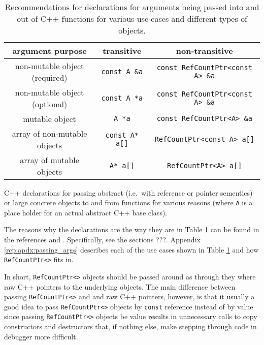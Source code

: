 \begin{table}
\begin{minipage}{{}\textwidth}
\end{minipage}
%
\\[5ex]
%
\begin{minipage}{{}\textwidth}
\begin{tabular}{|c|c|c|}
\hline
argument purpose
& transitive
& non-transitive \\
\hline
non-mutable object (required)
& {}\texttt{const A \&a}
& {}\texttt{const RefCountPtr<const A> \&a} \\
\hline
non-mutable object (optional)
& {}\texttt{const A *a}
& {}\texttt{const RefCountPtr<const A> \&a} \\
\hline
mutable object
& {}\texttt{A *a}
& {}\texttt{const RefCountPtr<A> \&a} \\
\hline
array of non-mutable objects
& {}\texttt{const A* a[]}
& {}\texttt{RefCountPtr<const A> a[]} \\
\hline
array of mutable objects
& {}\texttt{A* a[]}
& {}\texttt{RefCountPtr<A> a[]} \\
\hline
\end{tabular}
\begin{center}
C++ declarations for passing abstract (i.e.~with reference or pointer
sementics) or large concrete objects to and from functions for various
reasons (where {}\texttt{A} is a place holder for an actual abstract C++
base class).
\end{center}
\end{minipage}
%
\caption{\label{rcp:tbl:fnc-decl}
Recommendations for declarations for arguments being passed into and
out of C++ functions for various use cases and different types of
objects.}
%
\end{table}

The reasons why the declarations are the way they are in Table
{}\ref{rcp:tbl:fnc-decl} can be found in the references
{}\cite{ref:stroustrup_2000} and {}\cite{ref:meyers_1994}.
Specifically, see the sections ???.  Appendix
{}\ref{rcp:apdx:passing_args} describes each of the use cases shown in
Table {}{}\ref{rcp:tbl:fnc-decl} and how {}\texttt{RefCountPtr<>} fits
in.

In short, {}\texttt{RefCountPtr<>} objects should be passed around as
through they where raw C++ pointers to the underlying objects.  The
main difference between passing {}\texttt{RefCountPtr<>} and and raw
C++ pointers, however, is that it usually a good idea to pass
{}\texttt{RefCountPtr<>} objects by {}\texttt{const} reference instead
of by value since passing {}\texttt{RefCountPtr<>} objects be value
results in unnecessary calls to copy constructors and destructors
that, if nothing else, make stepping through code in debugger more
difficult.

